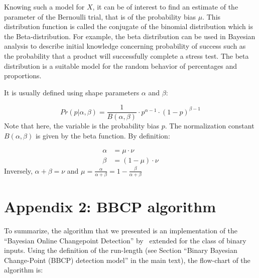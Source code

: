 \documentclass[10pt,letterpaper]{article}
\newcommand{\eq}[1]{\begin{equation*}#1\end{equation*}}
\newcommand{\eqs}[1]{\begin{align*}#1\end{align*}}
\newcommand{\seeSec}[1]{Section~\ref{sec:#1}}
\begin{document}
Knowing such a model for $X$, it can be of interest to find an estimate of the parameter of the Bernoulli trial, that is of the probability bias $\mu$. This distribution function is called the conjugate of the binomial distribution which is the Beta-distribution. For example, the beta distribution can be used in Bayesian analysis to describe initial knowledge concerning probability of success such as the probability that a product will successfully complete a stress test. The beta distribution is a suitable model for the random behavior of percentages and proportions.

It is usually defined using shape parameters $\alpha$ and $\beta$:

\eq{
Pr(p | \alpha, \beta ) = \frac{1}{B(\alpha, \beta)} \cdot p^{\alpha -1} \cdot (1-p)^{\beta - 1}
}
Note that here, the variable is the probability bias $p$. The normalization constant $B(\alpha, \beta)$ is given by the beta function. By definition:

\eqs{
        \alpha &= \mu \cdot \nu \\
        \beta  &= (1-\mu) \cdot \nu
    }
Inversely, $\alpha + \beta = \nu$ and $\mu = \frac{\alpha}{\alpha +\beta} = 1- \frac{\beta}{\alpha + \beta}$


\section{Appendix 2: BBCP algorithm}
\label{app:bcp}

To summarize, the algorithm that we presented is an implementation of the  ``Bayesian Online Changepoint Detection'' by~\citet{AdamsMackay2007}
extended for the class of binary inputs. Using the definition of the run-length (see Section ``Binary Bayesian Change-Point (BBCP) detection model'' in the main text), %
the flow-chart of the algorithm is:
\end{document}
